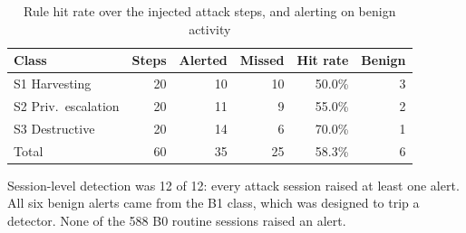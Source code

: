\begin{table}[t]
\centering
\caption{Rule hit rate over the injected attack steps, and alerting on benign activity}
\label{tab:detection_hitrate}
\footnotesize
\setlength{\tabcolsep}{4pt}
\begin{tabular}{@{}lrrrrr@{}}
\toprule
\textbf{Class} & \textbf{Steps} & \textbf{Alerted} & \textbf{Missed} & \textbf{Hit rate} & \textbf{Benign} \\
\midrule
S1 Harvesting          & 20 & 10 & 10 & 50.0\% & 3 \\
S2 Priv.\ escalation   & 20 & 11 &  9 & 55.0\% & 2 \\
S3 Destructive         & 20 & 14 &  6 & 70.0\% & 1 \\
\midrule
Total                         & 60 & 35 & 25 & 58.3\% & 6 \\
\bottomrule
\end{tabular}

\vspace{2pt}
\scriptsize\raggedright Session-level detection was 12 of 12: every attack session raised at
least one alert. All six benign alerts came from the B1 class, which was designed to
trip a detector. None of the 588 B0 routine sessions raised an alert.
\end{table}
